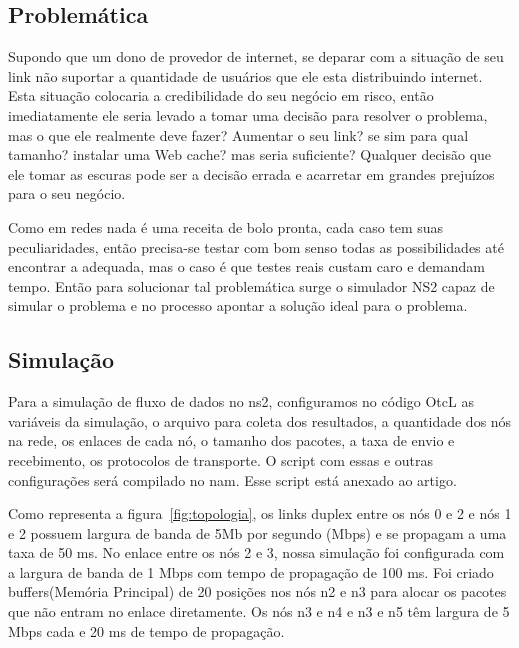 \documentclass[12pt]{article}
\begin{document}
\subsection{Problemática} 

Supondo que um dono de provedor de internet, se deparar com a situação de seu link não suportar a quantidade de usuários que ele esta distribuindo internet. Esta situação colocaria a credibilidade do seu negócio em risco, então imediatamente ele seria levado a tomar uma decisão para resolver o problema, mas o que ele realmente deve fazer? Aumentar o seu link? se sim para qual tamanho? instalar uma Web cache?  mas seria suficiente? Qualquer decisão que ele tomar as escuras pode ser a decisão errada e acarretar em grandes prejuízos para o seu negócio. 

Como em redes nada é uma receita de bolo pronta, cada caso tem suas peculiaridades, então precisa-se testar com bom senso todas as possibilidades até encontrar a adequada, mas o caso é que testes reais custam caro e demandam tempo. Então para solucionar tal problemática surge o simulador NS2 capaz de simular o problema e no processo apontar a solução ideal para o problema. 

\subsection{Simulação}

Para a simulação de fluxo de dados no ns2, configuramos no código OtcL as variáveis da simulação, o arquivo para coleta dos resultados, a quantidade dos nós na rede, os enlaces de cada nó, o tamanho dos pacotes, a taxa de envio e recebimento, os protocolos de transporte. O script com essas e outras configurações será compilado no nam. Esse script está anexado ao artigo.  

Como representa a figura~\ref{fig:topologia}, os links duplex entre os nós 0 e 2 e nós 1 e 2 possuem largura de banda de 5Mb por segundo (Mbps) e se propagam a uma taxa de 50 ms. No enlace entre os nós 2 e 3, nossa simulação foi configurada com a largura de banda de 1 Mbps com tempo de propagação de 100 ms. Foi criado buffers(Memória Principal) de 20 posições nos nós n2 e n3 para alocar os pacotes que não entram no enlace diretamente. Os nós n3 e n4 e n3 e n5 têm largura de 5 Mbps cada e 20 ms de tempo de propagação.  
\end{document}
